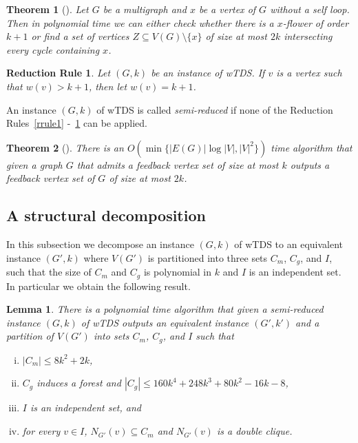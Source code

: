 \documentclass[a4paper,11pt]{article}
\newtheorem{rrule}{Reduction Rule}
\newtheorem{lemma}{Lemma}
\newtheorem{theorem}{Theorem}
\begin{document}
\begin{theorem}[\cite{Thomasse10}]\label{algosepvrt}
Let $G$ be a multigraph and $x$ be a vertex of $G$ without a self loop. Then in polynomial time we can either check whether there is 
a $x$-flower of order $k+1$ or find a set of vertices $Z\subseteq V(G)\setminus \{x\}$ of size at most $2k$ intersecting every cycle containing $x$.
\end{theorem}

\begin{rrule}\label{rrule6}
Let $(G,k)$ be an instance of {\sc wTDS}. If $v$ is a vertex such that $w(v)>k+1$, then let $w(v)=k+1$.
\end{rrule}

An instance $(G,k)$ of {\sc wTDS} is called {\em semi-reduced} if none of the Reduction Rules~\ref{rrule1} -~\ref{rrule6} can be applied.

\begin{theorem}[\cite{BafnaBF99}]\label{apprxalgofvs}
There is an $O(\min\{|E(G)|\log |V|,|V|^{2}\})$ time algorithm that given a graph $G$ that admits a feedback vertex set of size at most $k$ outputs a 
feedback vertex set of $G$ of size at most $2k$.
\end{theorem}


\subsection{A structural decomposition}\label{subsct:strcdecomp}

In this subsection we decompose an instance $(G,k)$ of {\sc wTDS} to an equivalent instance $(G',k)$ where $V(G')$ is partitioned into
three sets $C_{m}$, $C_{g}$, and $I$, such that the size of $C_{m}$ and $C_{g}$ is polynomial in $k$ and $I$ is an independent set.
In particular we obtain the following result. 

\begin{lemma}\label{mainlem}
There is a polynomial time algorithm that given a semi-reduced instance $(G,k)$ of {\sc wTDS} outputs an equivalent instance $(G',k')$ and 
a partition of $V(G')$ into sets $C_{m}$, $C_{g}$, and $I$ such that 
\begin{enumerate}[(i)]
\item\label{clse1} $|C_{m}|\leq 8k^{2}+2k$, 
\item\label{clse2} $C_{g}$ induces a forest and $|C_{g}|\leq 160k^{4}+248k^{3}+80k^{2}-16k-8$, 
\item\label{clse3} $I$ is an independent set, and 
\item\label{clse4} for every $v\in I$, $N_{G'}(v)\subseteq C_{m}$ and $N_{G'}(v)$ is a double clique.
\end{enumerate}
\end{lemma}
\end{document}
